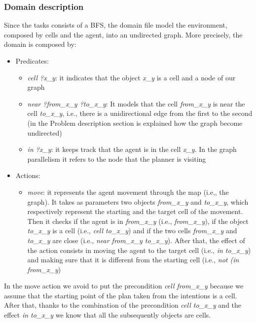 \documentclass[a4paper, 11pt]{article}
\begin{document}
\subsubsection{Domain description}

Since the tasks consists of a BFS, the domain file model the environment, composed by cells and the agent, into an undirected graph.
More precisely, the domain is composed by:
\begin{itemize}
    \item Predicates:
    \begin{itemize}
        \item \emph{cell ?x\_y}: it indicates that the object \emph{x\_y} is a cell and a node of our graph
        \item \emph{near ?from\_x\_y ?to\_x\_y}: It models that the cell \emph{from\_x\_y} is near the cell \emph{to\_x\_y}, i.e., there is a unidirectional edge from the first to the second (in the Problem description section is explained how the graph become undirected)
        \item \emph{in ?x\_y}: it keeps track that the agent is in the cell \emph{x\_y}. In the graph parallelism it refers to the node that the planner is visiting
    \end{itemize}
    \item Actions:
    \begin{itemize}
        \item \emph{move}: it represents the agent movement through the map (i.e,, the graph). It takes as parameters two objects \emph{from\_x\_y} and \emph{to\_x\_y}, which respectively represent the starting and the target cell of the movement. Then it checks if the agent is in \emph{from\_x\_y} (i.e., \emph{from\_x\_y}), if the object \emph{to\_x\_y} is a cell (i.e., \emph{cell to\_x\_y}) and if the two cells \emph{from\_x\_y} and \emph{to\_x\_y} are close (i.e., \emph{near from\_x\_y to\_x\_y}).
        After that, the effect of the action consists in moving the agent to the target cell (i.e., \emph{in to\_x\_y}) and making sure that it is different from the starting cell (i.e., \emph{not (in from\_x\_y})
    \end{itemize}
\end{itemize}

In the move action we avoid to put the precondition \emph{cell from\_x\_y} because we assume that the starting point of the plan taken from the intentions is a cell. After that, thanks to the combination of the precondition \emph{cell to\_x\_y} and the effect \emph{in to\_x\_y} we know that all the subsequently objects are cells.
\end{document}
